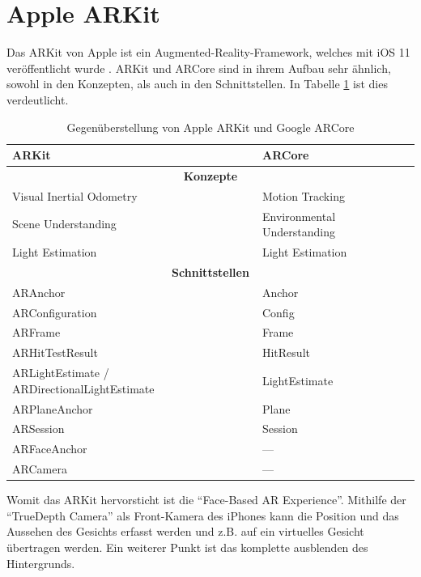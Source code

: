 
\section{Apple ARKit}
Das ARKit von Apple ist ein Augmented-Reality-Framework, welches mit iOS 11 veröffentlicht wurde \cite{apple_arkit}. ARKit und ARCore sind in ihrem Aufbau sehr ähnlich, sowohl in den Konzepten, als auch in den Schnittstellen. In Tabelle \ref{arkit_vs_arcore} ist dies verdeutlicht.

\begin{table}[h]
	\centering
	\begin{tabular}{|p{4cm}|p{4cm}|}
		\hline
		\textbf{ARKit} & \textbf{ARCore}\\
		\hline
		\multicolumn{2}{|c|}{\textbf{Konzepte}}\\
		\hline
		Visual Inertial Odometry & Motion Tracking\\
		Scene Understanding & Environmental Understanding\\
		Light Estimation & Light Estimation\\
		\hline
		\multicolumn{2}{|c|}{\textbf{Schnittstellen}}\\
		\hline
		ARAnchor & Anchor \\
		ARConfiguration & Config\\
		ARFrame & Frame\\
		ARHitTestResult & HitResult\\
		ARLightEstimate /
		\newline ARDirectionalLightEstimate & LightEstimate\newline\\
		ARPlaneAnchor & Plane\\
		ARSession & Session\\
		ARFaceAnchor & ---\\
		ARCamera & ---\\
		\hline
	\end{tabular}
	\caption{Gegenüberstellung von Apple ARKit\cite{arkit_reference} und Google ARCore\cite{arcore_android_reference}}
	\label{arkit_vs_arcore}
\end{table}

Womit das ARKit hervorsticht ist die "`Face-Based AR Experience"'. Mithilfe der "`TrueDepth Camera"' als Front-Kamera des iPhones kann die Position und das Aussehen des Gesichts erfasst werden und z.B. auf ein virtuelles Gesicht übertragen werden. Ein weiterer Punkt ist das komplette ausblenden des Hintergrunds.\cite{iphoneX}

